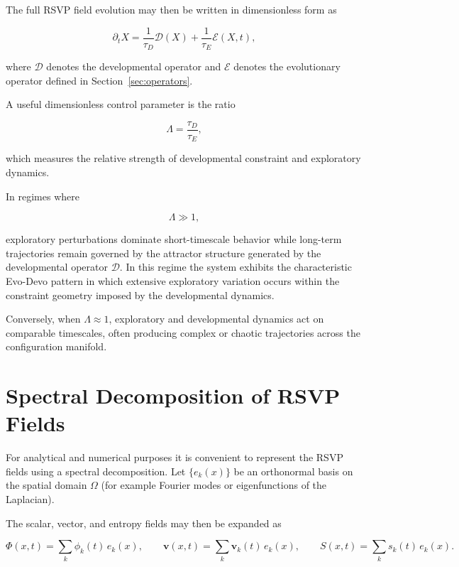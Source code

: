 \documentclass[12pt]{article}
\begin{document}
The full RSVP field evolution may then be written in dimensionless form as

\begin{equation}
\partial_t X =
\frac{1}{\tau_D}\mathcal{D}(X)
+
\frac{1}{\tau_E}\mathcal{E}(X,t),
\label{eq:timescale_decomposition}
\end{equation}

where $\mathcal{D}$ denotes the developmental operator and $\mathcal{E}$ denotes the evolutionary operator defined in Section~\ref{sec:operators}.

A useful dimensionless control parameter is the ratio

\begin{equation}
\Lambda =
\frac{\tau_D}{\tau_E},
\end{equation}

which measures the relative strength of developmental constraint and exploratory dynamics.

In regimes where

\begin{equation}
\Lambda \gg 1 ,
\end{equation}

exploratory perturbations dominate short-timescale behavior while long-term trajectories remain governed by the attractor structure generated by the developmental operator $\mathcal{D}$. In this regime the system exhibits the characteristic Evo-Devo pattern in which extensive exploratory variation occurs within the constraint geometry imposed by the developmental dynamics.

Conversely, when $\Lambda \approx 1$, exploratory and developmental dynamics act on comparable timescales, often producing complex or chaotic trajectories across the configuration manifold.

\section{Spectral Decomposition of RSVP Fields}
\label{sec:spectral}

For analytical and numerical purposes it is convenient to represent the RSVP fields using a spectral decomposition. Let $\{e_k(x)\}$ be an orthonormal basis on the spatial domain $\Omega$ (for example Fourier modes or eigenfunctions of the Laplacian).

The scalar, vector, and entropy fields may then be expanded as

\begin{equation}
\Phi(x,t) = \sum_{k} \phi_k(t)\, e_k(x), \qquad
\mathbf{v}(x,t) = \sum_{k} \mathbf{v}_k(t)\, e_k(x), \qquad
S(x,t) = \sum_{k} s_k(t)\, e_k(x).
\end{equation}
\end{document}
